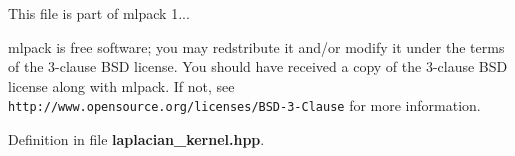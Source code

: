 This file is part of mlpack 1...

mlpack is free software; you may redstribute it and/or modify it under the terms of the 3-\/clause B\-S\-D license. You should have received a copy of the 3-\/clause B\-S\-D license along with mlpack. If not, see {\tt http\-://www.\-opensource.\-org/licenses/\-B\-S\-D-\/3-\/\-Clause} for more information. 

Definition in file {\bf laplacian\-\_\-kernel.\-hpp}.

